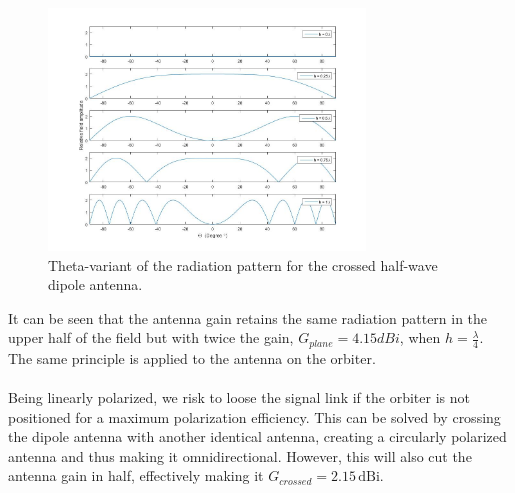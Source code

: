 \begin{figure}[!htb]
	\centering
	\includegraphics[width=0.75\textwidth]{figures/Rasmus/Lopes}
	\caption{Theta-variant of the radiation pattern for the crossed half-wave dipole antenna.
	\label{fig:Lobes}}
\end{figure}
It can be seen that the antenna gain retains the same radiation pattern in the upper half of the field but with twice the gain, $G_{plane}=4.15dBi$, when $h=\frac{\lambda}{4}$.\\
The same principle is applied to the antenna on the orbiter.\\
\\
Being linearly polarized, we risk to loose the signal link if the orbiter is not positioned for a maximum polarization efficiency. This can be solved by crossing the dipole antenna with another identical antenna, creating a circularly polarized antenna and thus making it omnidirectional. However, this will also cut the antenna gain in half, effectively making it $G_{crossed}=2.15\,\mathrm{dBi}$. 

